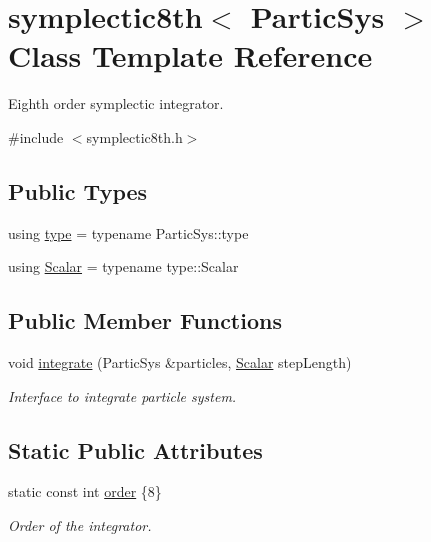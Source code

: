 \hypertarget{classsymplectic8th}{}\section{symplectic8th$<$ Partic\+Sys $>$ Class Template Reference}
\label{classsymplectic8th}


Eighth order symplectic integrator.  




{\ttfamily \#include $<$symplectic8th.\+h$>$}

\subsection*{Public Types}
\begin{DoxyCompactItemize}
\item 
using \mbox{\hyperlink{classsymplectic8th_a9e02e91dadeed454d5e3986f83c489fa}{type}} = typename Partic\+Sys\+::type
\item 
using \mbox{\hyperlink{classsymplectic8th_a3a85c2b58a75f2da56a6989a73a001b8}{Scalar}} = typename type\+::\+Scalar
\end{DoxyCompactItemize}
\subsection*{Public Member Functions}
\begin{DoxyCompactItemize}
\item 
void \mbox{\hyperlink{classsymplectic8th_a6d3406699e9edfe9fe0791821b719fe0}{integrate}} (Partic\+Sys \&particles, \mbox{\hyperlink{classsymplectic8th_a3a85c2b58a75f2da56a6989a73a001b8}{Scalar}} step\+Length)
\begin{DoxyCompactList}\small\item\em Interface to integrate particle system. \end{DoxyCompactList}\end{DoxyCompactItemize}
\subsection*{Static Public Attributes}
\begin{DoxyCompactItemize}
\item 
static const int \mbox{\hyperlink{classsymplectic8th_a5f80ae81362e3542cb9ed7653f1b20d6}{order}} \{8\}
\begin{DoxyCompactList}\small\item\em Order of the integrator. \end{DoxyCompactList}\end{DoxyCompactItemize}


